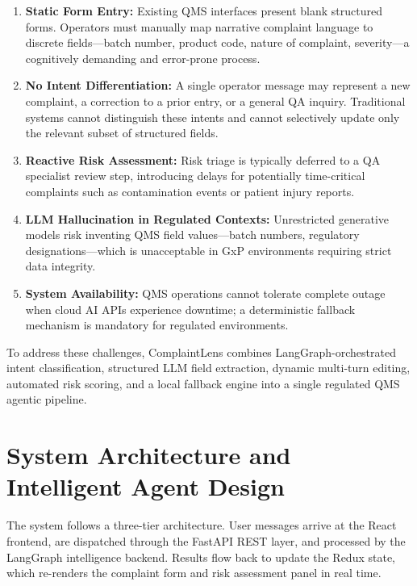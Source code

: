 \documentclass[12pt,a4paper]{report}
\begin{document}
\begin{enumerate}[leftmargin=*]
\item \textbf{Static Form Entry:} Existing QMS interfaces present blank structured forms. Operators must manually map narrative complaint language to discrete fields---batch number, product code, nature of complaint, severity---a cognitively demanding and error-prone process.

\item \textbf{No Intent Differentiation:} A single operator message may represent a new complaint, a correction to a prior entry, or a general QA inquiry. Traditional systems cannot distinguish these intents and cannot selectively update only the relevant subset of structured fields.

\item \textbf{Reactive Risk Assessment:} Risk triage is typically deferred to a QA specialist review step, introducing delays for potentially time-critical complaints such as contamination events or patient injury reports.

\item \textbf{LLM Hallucination in Regulated Contexts:} Unrestricted generative models risk inventing QMS field values---batch numbers, regulatory designations---which is unacceptable in GxP environments requiring strict data integrity.

\item \textbf{System Availability:} QMS operations cannot tolerate complete outage when cloud AI APIs experience downtime; a deterministic fallback mechanism is mandatory for regulated environments.
\end{enumerate}

To address these challenges, ComplaintLens combines LangGraph-orchestrated intent classification, structured LLM field extraction, dynamic multi-turn editing, automated risk scoring, and a local fallback engine into a single regulated QMS agentic pipeline.

\section{System Architecture and Intelligent Agent Design}

The system follows a three-tier architecture. User messages arrive at the React frontend, are dispatched through the FastAPI REST layer, and processed by the LangGraph intelligence backend. Results flow back to update the Redux state, which re-renders the complaint form and risk assessment panel in real time.
\end{document}
